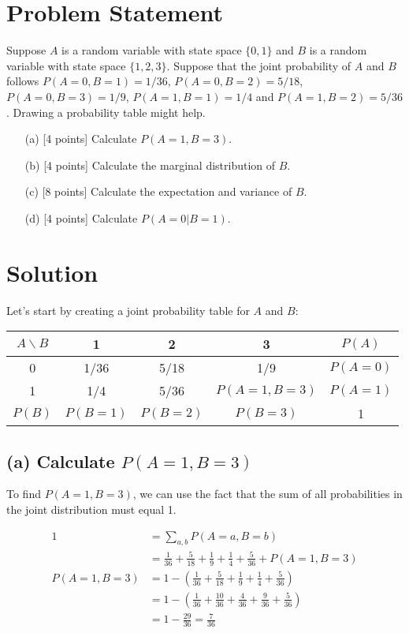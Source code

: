 \documentclass{article}
\begin{document}
\section*{Problem Statement}

Suppose $A$ is a random variable with state space $\{0, 1\}$ and $B$ is a random variable with state space $\{1, 2, 3\}$. Suppose that the joint probability of $A$ and $B$ follows $P(A = 0, B = 1) = 1/36$, $P(A = 0, B = 2) = 5/18$, $P(A = 0, B = 3) = 1/9$, $P(A = 1, B = 1) = 1/4$ and $P(A = 1, B = 2) = 5/36$. Drawing a probability table might help.

\begin{enumerate}
    \item[(a)] [4 points] Calculate $P(A = 1, B = 3)$.
    \item[(b)] [4 points] Calculate the marginal distribution of $B$.
    \item[(c)] [8 points] Calculate the expectation and variance of $B$.
    \item[(d)] [4 points] Calculate $P(A = 0|B = 1)$.
\end{enumerate}

\section*{Solution}

Let's start by creating a joint probability table for $A$ and $B$:

\begin{table}[h]
\centering
\begin{tabular}{c|ccc|c}
$A \backslash B$ & 1 & 2 & 3 & $P(A)$ \\
\hline
0 & 1/36 & 5/18 & 1/9 & $P(A=0)$ \\
1 & 1/4 & 5/36 & $P(A=1,B=3)$ & $P(A=1)$ \\
\hline
$P(B)$ & $P(B=1)$ & $P(B=2)$ & $P(B=3)$ & 1
\end{tabular}
\end{table}

\subsection*{(a) Calculate $P(A = 1, B = 3)$}

To find $P(A = 1, B = 3)$, we can use the fact that the sum of all probabilities in the joint distribution must equal 1.

\begin{align*}
1 &= \sum_{a,b} P(A=a, B=b) \\
&= \frac{1}{36} + \frac{5}{18} + \frac{1}{9} + \frac{1}{4} + \frac{5}{36} + P(A=1, B=3) \\
P(A=1, B=3) &= 1 - (\frac{1}{36} + \frac{5}{18} + \frac{1}{9} + \frac{1}{4} + \frac{5}{36}) \\
&= 1 - (\frac{1}{36} + \frac{10}{36} + \frac{4}{36} + \frac{9}{36} + \frac{5}{36}) \\
&= 1 - \frac{29}{36} = \frac{7}{36}
\end{align*}
\end{document}
